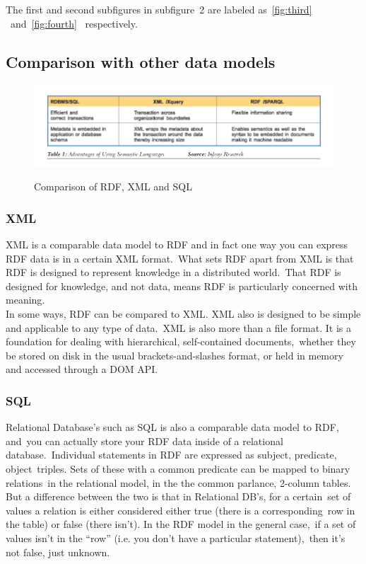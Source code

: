   \noindent The first and second subfigures in subfigure\
  2 are labeled as\
  \ref{fig:third} \citep{parachuri2008role}\
  and~\ref{fig:fourth}~\citep{_Borden_2013} respectively.\\


 \subsection{Comparison with other data models}

  \begin{figure}[ht!]
    \centering
    \includegraphics[scale=0.5]{sqlrdf.png}
    \caption{Comparison of RDF, XML and SQL}
    \citep[Fig.~1]{parachuri2008role}
    \label{fig:rdfcomp}
  \end{figure}  

  \subsubsection{XML}
  XML is a comparable data model to RDF and in fact one way you can express RDF data is in a certain XML format.\
  What sets RDF apart from XML is that RDF is designed to represent knowledge in a distributed world.\
  That RDF is designed for knowledge, and not data, means RDF is particularly concerned with meaning.\\

  \noindent In some ways, RDF can be compared to XML. XML also is designed to be simple and applicable to any type of data.\
  XML is also more than a file format. It is a foundation for dealing with hierarchical, self-contained documents,\
  whether they be stored on disk in the usual brackets-and-slashes format, or held in memory and accessed through a DOM API.\
  \citep{_rdf_about_2013}\

  \subsubsection{SQL}
  Relational Database’s such as SQL is also a comparable data model to RDF, and\
  you can actually store your RDF data inside of a relational database.\
  Individual statements in RDF are expressed as subject, predicate, object\ 
  triples. Sets of these with a common predicate can be mapped to binary relations\
  in the relational model, in the the common parlance, 2-column tables.\\

  \noindent But a difference between the two is that in Relational DB's, for a certain\
  set of values a relation is either considered either true (there is a corresponding\
  row in the table) or false (there isn't). In the RDF model in the general case,\
  if a set of values isn't in the ``row'' (i.e. you don't have a particular statement),\
  then it's not false, just unknown. \citep{_rdf_comparison_2013}\
